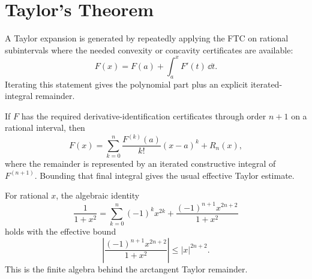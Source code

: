 \section{Taylor's Theorem}

\begin{definition}\label{def:taylor-iterated-ftc}
A Taylor expansion is generated by repeatedly applying the FTC on rational
subintervals where the needed convexity or concavity certificates are
available:
\[
  F(x)
  =
  F(a)+\int_a^x F'(t)\,\dd t.
\]
Iterating this statement gives the polynomial part plus an explicit
iterated-integral remainder.
\end{definition}

\begin{theorem}\label{thm:taylor-integral-remainder}
If \(F\) has the required derivative-identification certificates through
order \(n+1\) on a rational interval, then
\[
  F(x)
  =
  \sum_{k=0}^{n} \frac{F^{(k)}(a)}{k!}(x-a)^k
  +
  R_n(x),
\]
where the remainder is represented by an iterated constructive integral of
\(F^{(n+1)}\).  Bounding that final integral gives the usual effective
Taylor estimate.
\end{theorem}

\begin{theorem}\label{thm:atan-kernel-rem}
\leanok
For rational \(x\), the algebraic identity
\[
  \frac{1}{1+x^2}
  =
  \sum_{k=0}^{n} (-1)^k x^{2k}
  +
  \frac{(-1)^{n+1}x^{2n+2}}{1+x^2}
\]
holds with the effective bound
\[
  \left|
    \frac{(-1)^{n+1}x^{2n+2}}{1+x^2}
  \right|
  \le |x|^{2n+2}.
\]
This is the finite algebra behind the arctangent Taylor remainder.
\end{theorem}

